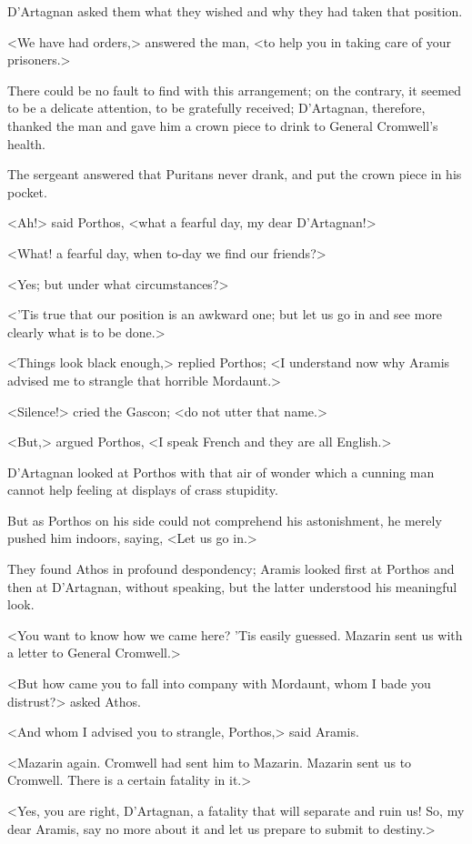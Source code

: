 D'Artagnan asked them what they wished and why they had taken that position.

<We have had orders,> answered the man, <to help you in taking care of your prisoners.>

There could be no fault to find with this arrangement; on the contrary, it seemed to be a delicate attention, to be gratefully received; D'Artagnan, therefore, thanked the man and gave him a crown piece to drink to General Cromwell's health.

The sergeant answered that Puritans never drank, and put the crown piece in his pocket.

<Ah!> said Porthos, <what a fearful day, my dear D'Artagnan!>

<What! a fearful day, when to-day we find our friends?>

<Yes; but under what circumstances?>

<'Tis true that our position is an awkward one; but let us go in and see more clearly what is to be done.>

<Things look black enough,> replied Porthos; <I understand now why Aramis advised me to strangle that horrible Mordaunt.>

<Silence!> cried the Gascon; <do not utter that name.>

<But,> argued Porthos, <I speak French and they are all English.>

D'Artagnan looked at Porthos with that air of wonder which a cunning man cannot help feeling at displays of crass stupidity.

But as Porthos on his side could not comprehend his astonishment, he merely pushed him indoors, saying, <Let us go in.>

They found Athos in profound despondency; Aramis looked first at Porthos and then at D'Artagnan, without speaking, but the latter understood his meaningful look.

<You want to know how we came here? 'Tis easily guessed. Mazarin sent us with a letter to General Cromwell.>

<But how came you to fall into company with Mordaunt, whom I bade you distrust?> asked Athos.

<And whom I advised you to strangle, Porthos,> said Aramis.

<Mazarin again. Cromwell had sent him to Mazarin. Mazarin sent us to Cromwell. There is a certain fatality in it.>

<Yes, you are right, D'Artagnan, a fatality that will separate and ruin us! So, my dear Aramis, say no more about it and let us prepare to submit to destiny.>

